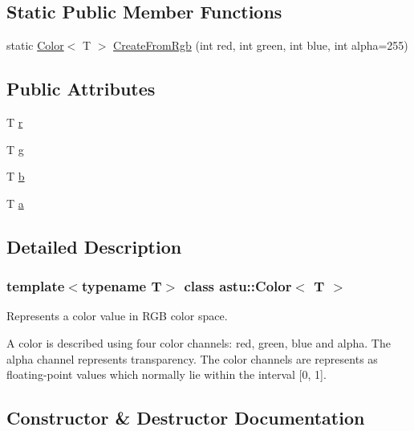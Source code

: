 \subsection*{Static Public Member Functions}
\begin{DoxyCompactItemize}
\item 
static \hyperlink{classastu_1_1Color}{Color}$<$ T $>$ \hyperlink{classastu_1_1Color_a02abdb3a0d65626cb6bae8cbad7d6dfd}{Create\+From\+Rgb} (int red, int green, int blue, int alpha=255)
\end{DoxyCompactItemize}
\subsection*{Public Attributes}
\begin{DoxyCompactItemize}
\item 
T \hyperlink{classastu_1_1Color_aa670f74822e1db4513844dca52b1eb6a}{r}
\item 
T \hyperlink{classastu_1_1Color_a3134881dda38a8f123387faeff309dff}{g}
\item 
T \hyperlink{classastu_1_1Color_a56d075e69ca5e4cea336f3977b04dee2}{b}
\item 
T \hyperlink{classastu_1_1Color_ad62b3af3464dea4bf99432bfb6e9d796}{a}
\end{DoxyCompactItemize}


\subsection{Detailed Description}
\subsubsection*{template$<$typename T$>$\newline
class astu\+::\+Color$<$ T $>$}

Represents a color value in R\+GB color space.

A color is described using four color channels\+: red, green, blue and alpha. The alpha channel represents transparency. The color channels are represents as floating-\/point values which normally lie within the interval \mbox{[}0, 1\mbox{]}. 

\subsection{Constructor \& Destructor Documentation}
\mbox{\label{classastu_1_1Color_abb0e2cdad572357375d5b2465ea847b9}} 
